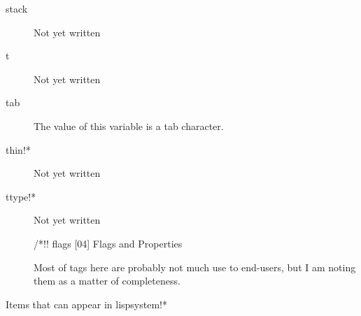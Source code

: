 \documentclass[a4paper,11pt]{article}
\begin{document}
\begin{description}
\item [{\ttfamily stack}]
Not yet written

\item [{\ttfamily t}]
Not yet written

\item [{\ttfamily tab}]
The value of this variable is a tab character.

\item [{\ttfamily thin!*}]
Not yet written

\item [{\ttfamily ttype!*}]
Not yet written

/*!! flags [04] Flags and Properties
  
Most of tags here are probably not much use to end-users, but I am noting them
as a matter of completeness.
  

\end{description}

Items that can appear in {\ttfamily lispsystem!*}
  
\end{document}
